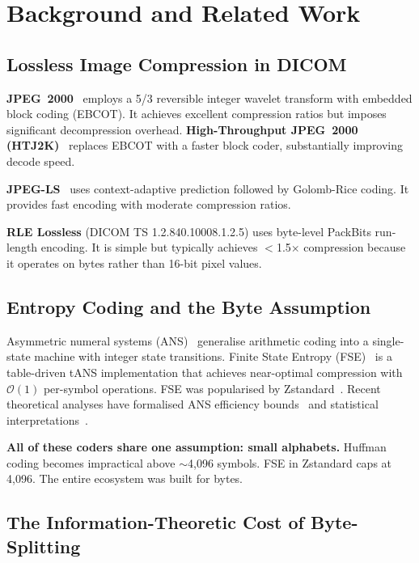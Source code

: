 \documentclass[journal]{IEEEtran}
\begin{document}
\section{Background and Related Work}
\label{sec:background}

\subsection{Lossless Image Compression in DICOM}

\textbf{JPEG~2000}~\cite{taubman2002} employs a 5/3 reversible integer wavelet
transform with embedded block coding (EBCOT). It achieves excellent compression
ratios but imposes significant decompression overhead. \textbf{High-Throughput
JPEG~2000 (HTJ2K)}~\cite{htj2k2019} replaces EBCOT with a faster block coder,
substantially improving decode speed.

\textbf{JPEG-LS}~\cite{loco1} uses context-adaptive prediction followed by
Golomb-Rice coding. It provides fast encoding with moderate compression ratios.

\textbf{RLE Lossless} (DICOM TS 1.2.840.10008.1.2.5) uses byte-level PackBits
run-length encoding. It is simple but typically achieves $<$1.5$\times$
compression because it operates on bytes rather than 16-bit pixel values.

\subsection{Entropy Coding and the Byte Assumption}

Asymmetric numeral systems (ANS)~\cite{duda2009,duda2013} generalise arithmetic
coding into a single-state machine with integer state transitions. Finite State
Entropy (FSE)~\cite{fse} is a table-driven tANS implementation that achieves
near-optimal compression with $\mathcal{O}(1)$ per-symbol operations. FSE was
popularised by Zstandard~\cite{rfc8878}. Recent theoretical analyses have
formalised ANS efficiency bounds~\cite{kosolobov2022} and statistical
interpretations~\cite{bamler2022}.

\textbf{All of these coders share one assumption: small alphabets.} Huffman
coding becomes impractical above $\sim$4,096 symbols. FSE in Zstandard caps at
4,096. The entire ecosystem was built for bytes.

\subsection{The Information-Theoretic Cost of Byte-Splitting}
\end{document}
